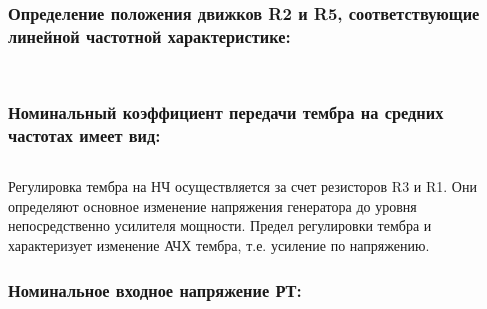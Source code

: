 \subsubsection{ Определение положения движков R2 и R5, соответствующие линейной частотной характеристике:}

  \begin{equation}
  \label{eq:equation5_16}
  
  \end{equation}

  \begin{equation}
  \label{eq:equation5_17}
  
  \end{equation}

  \subsubsection{ Номинальный коэффициент передачи тембра на средних частотах имеет вид:}
   
  \begin{equation}
  \label{eq:equation5_18}
   
  \end{equation}

  Регулировка тембра на НЧ осуществляется за счет резисторов R3 и R1. Они определяют основное изменение напряжения генератора до уровня непосредственно усилителя мощности. Предел регулировки тембра и характеризует изменение АЧХ тембра, т.е. усиление по напряжению.

  \subsubsection{  Номинальное входное напряжение РТ:}

  \begin{equation}
  \label{eq:equation5_19}
   
  \end{equation}


   